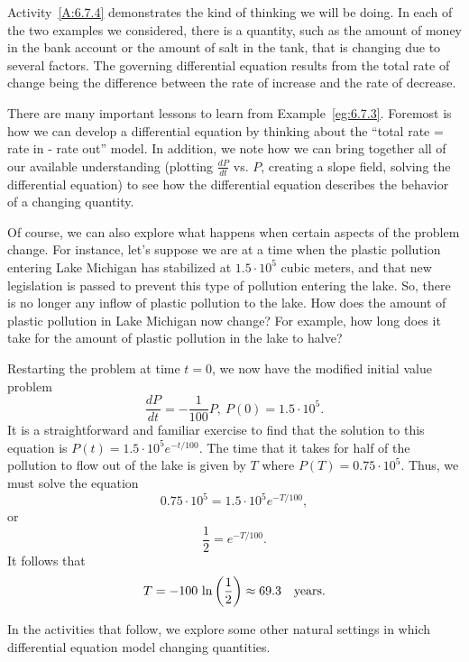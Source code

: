 
Activity~\ref{A:6.7.4} demonstrates the kind of thinking we will be
doing.  In each of the two examples we considered, there is a
quantity, such as the amount of money in the bank account or the
amount of salt in the tank, that is changing due to several factors.
The governing differential equation results from the total rate of change being the difference between the rate of
increase and the rate of decrease.


There are many important lessons to learn from Example~\ref{eg:6.7.3}.  Foremost is how we can develop a differential equation by thinking about the ``total rate = rate in - rate out'' model.  In addition, we note how we can bring together all of our available understanding (plotting $\frac{dP}{dt}$ vs. $P$, creating a slope field, solving the differential equation) to see how the differential equation describes the behavior of a changing quantity.

Of course, we can also explore what happens when certain aspects of the problem change.  For instance, let's suppose we are at a time when the plastic pollution entering Lake Michigan has
stabilized at $1.5\cdot10^5$ cubic meters, and that new legislation is
passed to prevent this type of pollution entering the lake.  So, there is no longer any inflow of plastic pollution to the lake.  How does the amount of plastic pollution in Lake Michigan now change?  For example, how long does it take for the amount of plastic pollution in the lake to halve?

Restarting the problem at time $t=0$, we now have the modified initial value problem
$$
\frac{dP}{dt} = -\frac{1}{100}P, \ P(0) = 1.5\cdot10^5.
$$
It is a straightforward and familiar exercise to find that the solution to this equation is $P(t) = 1.5\cdot10^5
e^{-t/100}$.  The time that it takes for half of the pollution to flow
out of the lake is given by $T$ where $P(T) = 0.75\cdot10^5$.  Thus, we must solve the equation
$$0.75\cdot10^5 = 1.5\cdot10^5e^{-T/100},$$
or
$$ \frac12 = e^{-T/100}.$$
It follows that 
$$T = -100\thinspace\ln\left(\frac12\right) \approx 69.3 \quad\hbox{years.}$$

In the activities that follow, we explore some other natural settings in which differential equation model changing quantities.



